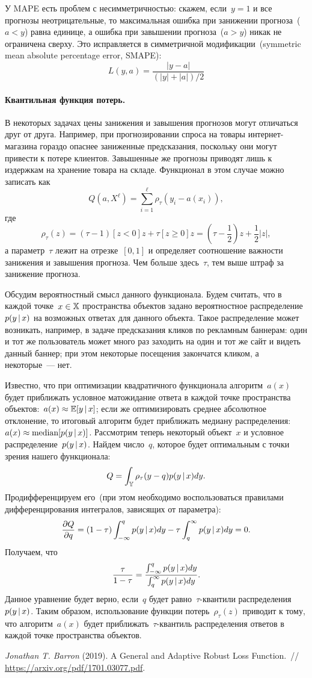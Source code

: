 \documentclass[12pt,fleqn]{article}
\begin{document}
У MAPE есть проблем с несимметричностью: скажем, если~$y = 1$ и все прогнозы неотрицательные,
то максимальная ошибка при занижении прогноза~($a < y$) равна единице, а ошибка при
завышении прогноза~($a > y$) никак не ограничена сверху.
Это исправляется в симметричной модификации~(symmetric mean absolute percentage error, SMAPE):
\[
    L(y, a) = \frac{|y - a|}{(|y| + |a|) / 2}
\]

\paragraph{Квантильная функция потерь.}

В некоторых задачах цены занижения и завышения прогнозов могут отличаться друг от друга.
Например, при прогнозировании спроса на товары интернет-магазина гораздо опаснее заниженные
предсказания, поскольку они могут привести к потере клиентов.
Завышенные же прогнозы приводят лишь к издержкам на хранение товара на складе.
Функционал в этом случае можно записать как
\[
    Q(a, X^\ell)
    =
    \sum_{i = 1}^{\ell}
        \rho_\tau(y_i - a(x_i)),
\]
где
\[
    \rho_\tau(z)
    =
    (\tau - 1) [z < 0] z
    +
    \tau [z \geq 0] z
    =
    (\tau - \frac{1}{2})z + \frac{1}{2} |z|,
\]
а параметр~$\tau$ лежит на отрезке~$[0, 1]$ и определяет
соотношение важности занижения и завышения прогноза.
Чем больше здесь~$\tau$, тем выше штраф за занижение прогноза.

Обсудим вероятностный смысл данного функционала.
Будем считать, что в каждой точке~$x \in \mathbb{X}$ пространства объектов
задано вероятностное распределение~$p(y \mspace{3mu}{|}\mspace{3mu} x)$ на возможных ответах для данного объекта.
Такое распределение может возникать, например, в задаче предсказания кликов по рекламным баннерам:
один и тот же пользователь может много раз заходить на один и тот же сайт и видеть данный баннер;
при этом некоторые посещения закончатся кликом, а некоторые~--- нет.

Известно, что при оптимизации квадратичного функционала алгоритм~$a(x)$
будет приближать условное матожидание ответа в каждой точке пространства
объектов:~$a(x) \approx \mathbb{E} [y \mspace{3mu}{|}\mspace{3mu} x]$;
если же оптимизировать среднее абсолютное отклонение, то итоговый алгоритм
будет приближать медиану распределения:~$a(x) \approx \text{median} [p(y \mspace{3mu}{|}\mspace{3mu} x)]$.
Рассмотрим теперь некоторый объект~$x$ и условное распределение~$p(y \mspace{3mu}{|}\mspace{3mu} x)$.
Найдем  число~$q$, которое будет оптимальным с точки зрения нашего функционала:
\[
    Q = \int_{\mathbb{Y}} \rho_\tau(y - q) p(y \mspace{3mu}{|}\mspace{3mu} x) dy.
\]
Продифференцируем его~(при этом необходимо воспользоваться правилами
дифференцирования интегралов, зависящих от параметра):
\[
    \frac{\partial Q}{\partial q}
    =
    (1 - \tau) \int_{-\infty}^{q} p(y \mspace{3mu}{|}\mspace{3mu} x) dy
    -
    \tau \int_{q}^{\infty} p(y \mspace{3mu}{|}\mspace{3mu} x) dy
    =
    0.
\]
Получаем, что
\[
    \frac{\tau}{1 - \tau}
    =
    \frac{
        \int_{-\infty}^{q} p(y \mspace{3mu}{|}\mspace{3mu} x) dy
    }{
        \int_{q}^{\infty} p(y \mspace{3mu}{|}\mspace{3mu} x) dy
    }.
\]
Данное уравнение будет верно, если~$q$ будет равно~$\tau$-квантили распределения~$p(y \mspace{3mu}{|}\mspace{3mu} x)$.
Таким образом, использование функции потерь~$\rho_\tau(z)$ приводит к тому,
что алгоритм~$a(x)$ будет приближать~$\tau$-квантиль распределения ответов в каждой точке
пространства объектов.


\begin{thebibliography}{1}
    \emph{Jonathan T. Barron} (2019).
    A General and Adaptive Robust Loss Function.~//
    \url{https://arxiv.org/pdf/1701.03077.pdf}.
\end{thebibliography}
\end{document}

